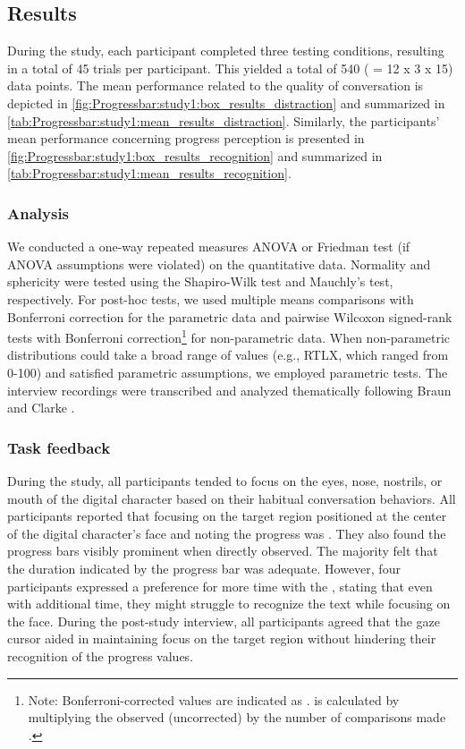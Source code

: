\subsection{Results}

During the study, each participant completed three testing conditions, resulting in a total of 45 trials per participant. This yielded a total of 540 ( = 12 x 3 x 15) data points. The mean performance related to the quality of conversation is depicted in \autoref{fig:Progressbar:study1:box_results_distraction} and summarized in \autoref{tab:Progressbar:study1:mean_results_distraction}. Similarly, the participants' mean performance concerning progress perception is presented in \autoref{fig:Progressbar:study1:box_results_recognition} and summarized in \autoref{tab:Progressbar:study1:mean_results_recognition}.

\subsubsection*{Analysis}
\label{study1:analysis}

We conducted a one-way repeated measures ANOVA or Friedman test (if ANOVA assumptions were violated) on the quantitative data. Normality and sphericity were tested using the Shapiro-Wilk test and Mauchly's test, respectively. For post-hoc tests, we used multiple means comparisons with Bonferroni correction for the parametric data and pairwise Wilcoxon signed-rank tests with Bonferroni correction\footnote{Note: Bonferroni-corrected \pval{} values are indicated as \pbonf{}. \pbonf{} is calculated by multiplying the observed (uncorrected) \pval{} by the number of comparisons made \cite{Bland170, ibm_calculation_2023}.} for non-parametric data. When non-parametric distributions could take a broad range of values (e.g., RTLX, which ranged from 0-100) and satisfied parametric assumptions, we employed parametric tests. The interview recordings were transcribed and analyzed thematically following Braun and Clarke \cite{braun_using_2006}.


\subsubsection*{Task feedback} 

During the study, all participants tended to focus on the eyes, nose, nostrils, or mouth of the digital character based on their habitual conversation behaviors. All participants reported that focusing on the target region positioned at the center of the digital character's face and noting the progress was . They also found the progress bars visibly prominent when directly observed. The majority felt that the duration indicated by the progress bar was adequate. However, four participants expressed a preference for more time with the \textbar{}, stating that even with additional time, they might struggle to recognize the text while focusing on the face. During the post-study interview, all participants agreed that the gaze cursor aided in maintaining focus on the target region without hindering their recognition of the progress values.


